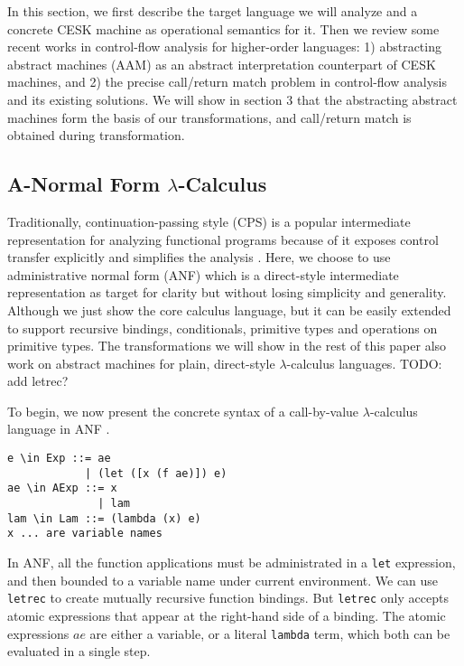 \documentclass[acmsmall,review,anonymous]{acmart}\settopmatter{printfolios=true,printccs=false,printacmref=false}
\begin{document}
In this section, we first describe the target language we will
analyze and a concrete CESK machine as operational semantics for it.
Then we review some recent works in control-flow analysis for
higher-order languages:
1) abstracting abstract machines (AAM) as an abstract interpretation
counterpart of CESK machines, and
2) the precise call/return match problem in control-flow analysis and its existing solutions.
We will show in section 3 that the abstracting abstract machines form the basis of our transformations,
and call/return match is obtained during transformation.

\subsection{A-Normal Form $\lambda$-Calculus} \label{anfsyntax}

Traditionally, continuation-passing style (CPS) is a popular intermediate representation
for analyzing functional programs because of it exposes control transfer explicitly
and simplifies the analysis \cite{Shivers:1991:SSC:115865.115884, Shivers:1988:CFA:53990.54007}.
Here, we choose to use administrative normal form (ANF) which is a direct-style intermediate representation 
as target for clarity but without losing simplicity and generality.
Although we just show the core calculus language, but it can be easily extended
to support recursive bindings, conditionals, primitive types and operations on primitive types.
The transformations we will show in the rest of this paper
also work on abstract machines for plain, direct-style $\lambda$-calculus languages.
TODO: add letrec?

To begin, we now present the concrete syntax of a call-by-value $\lambda$-calculus language 
in ANF \cite{flanagan1993essence}.

\begin{verbatim}
e \in Exp ::= ae
            | (let ([x (f ae)]) e)
ae \in AExp ::= x
              | lam
lam \in Lam ::= (lambda (x) e)
x ... are variable names
\end{verbatim}

In ANF, all the function applications must be administrated in a \texttt{let} expression,
and then bounded to a variable name under current environment.
We can use \texttt{letrec} to create mutually recursive function bindings. But \texttt{letrec}
only accepts atomic expressions that appear at the right-hand side of a binding.
The atomic expressions $ae$ are either a variable, or a literal \texttt{lambda} term, which
both can be evaluated in a single step.
\end{document}
